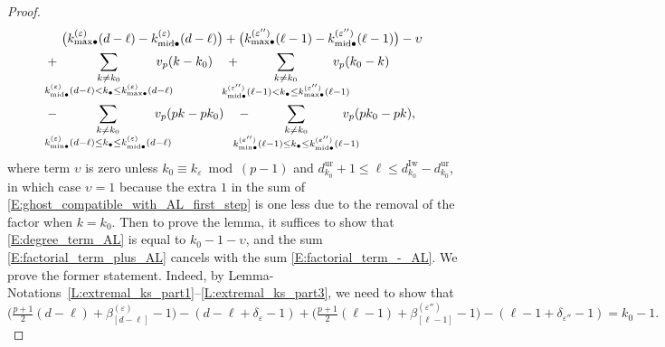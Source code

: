 \begin{proof}
    \begin{align} \label{E:degree_term_AL}
    &\big( k^{(\varepsilon)}_{{\max}\bullet}(d-\ell) - k^{(\varepsilon)}_{{{\mathrm{mid}}}\bullet}(d-\ell) \big)+ \big( k^{(\varepsilon'')}_{{\max}\bullet}(\ell-1) - k^{(\varepsilon'')}_{{{\mathrm{mid}}}\bullet}(\ell-1)\big) - \upsilon \\
    \label{E:factorial_term_plus_AL}
    +\ & \hspace{-15pt}\sum_{\substack{k \neq k_0\\ k^{(\varepsilon)}_{{\mathrm{mid}}\bullet}(d-\ell) < k_\bullet \leq k^{(\varepsilon)}_{{\max}\bullet}(d-\ell)}} \hspace{-15pt}v_p(k-k_0)\quad + \hspace{-15pt} \sum_{\substack{k \neq k_0\\ k^{(\varepsilon'')}_{{{\mathrm{mid}}}\bullet}(\ell-1) < k_\bullet \leq k^{(\varepsilon'')}_{{\max}\bullet}(\ell-1)}} \hspace{-15pt}v_p(k_0-k)\quad  \\
    \label{E:factorial_term_-_AL}
    -\ & \hspace{-15pt} \sum_{\substack{k \neq k_0\\ k^{(\varepsilon)}_{{\min}\bullet}(d-\ell) \leq k_\bullet \leq k^{(\varepsilon)}_{{{\mathrm{mid}}}\bullet}(d-\ell)}} \hspace{-15pt}v_p(pk-pk_0)\quad - \hspace{-15pt}\sum_{\substack{k \neq k_0\\ k^{(\varepsilon'')}_{{\min}\bullet}(\ell-1) \leq  k_\bullet \leq k^{(\varepsilon'')}_{{{\mathrm{mid}}}\bullet}(\ell-1)}} \hspace{-15pt}v_p(pk_0-pk),
    \end{align}
    where term $\upsilon$ is zero unless $k_0 \equiv k_\varepsilon \bmod{(p-1)}$ and $d_{k_0}^{\mathrm{ur}}+1\leq  \ell\leq d_{k_0}^{\mathrm{Iw}}- d_{k_0}^{\mathrm{ur}}$,
    in which case $\upsilon = 1$ because the extra $1$ in the sum of \eqref{E:ghost_compatible_with_AL_first_step} is one less due to the removal of the factor when $k = k_0$.
    Then to prove the lemma, it suffices to show that \eqref{E:degree_term_AL} is equal to $k_0-1-\upsilon$, and the sum \eqref{E:factorial_term_plus_AL} cancels with the sum \eqref{E:factorial_term_-_AL}.
    We prove the former statement.
    Indeed, by Lemma-Notations~\ref{L:extremal_ks_part1}--\ref{L:extremal_ks_part3}, we need to show that
    $$ \big(\tfrac{p+1}2 (d-\ell) + \beta_{[d-\ell]}^{(\varepsilon)}-1\big) - (d-\ell + \delta_\varepsilon -1)  + \big(\tfrac{p+1}2 (\ell-1) + \beta_{[\ell-1]}^{(\varepsilon'')}-1\big) - (\ell-1 + \delta_{\varepsilon''} -1)=k_0-1. $$

\end{proof}

